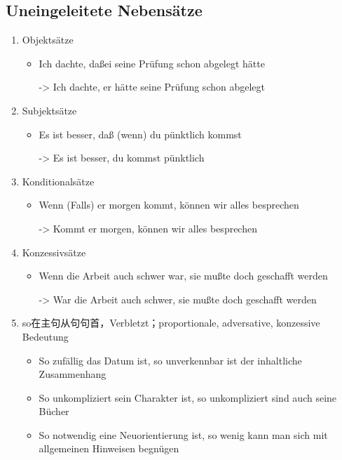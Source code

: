 \documentclass[UTF8]{report}
\begin{document}
\subsection{Uneingeleitete Nebensätze}
\begin{enumerate}
    \item Objektsätze
    \begin{itemize}
        \item Ich dachte, daßei seine Prüfung schon abgelegt hätte
        
        -> Ich dachte, er hätte seine Prüfung schon abgelegt
    \end{itemize}
    \item Subjektsätze
    \begin{itemize}
        \item Es ist besser, daß (wenn) du pünktlich kommst
        
        -> Es ist besser, du kommst pünktlich
    \end{itemize}
    \item Konditionalsätze
    \begin{itemize}
        \item Wenn (Falls) er morgen kommt, können wir alles besprechen
        
        -> Kommt er morgen, können wir alles besprechen
    \end{itemize}
    \item Konzessivsätze
    \begin{itemize}
        \item Wenn die Arbeit auch schwer war, sie mußte doch geschafft werden
        
        -> War die Arbeit auch schwer, sie mußte doch geschafft werden
    \end{itemize}
    \item so在主句从句句首，Verbletzt；proportionale, adversative, konzessive Bedeutung
    \begin{itemize}
        \item So zufällig das Datum ist, so unverkennbar ist der inhaltliche Zusammenhang
        \item So unkompliziert sein Charakter ist, so unkompliziert sind auch seine Bücher
        \item So notwendig eine Neuorientierung ist, so wenig kann man sich mit allgemeinen Hinweisen begnügen
    \end{itemize}
\end{enumerate}
\end{document}
